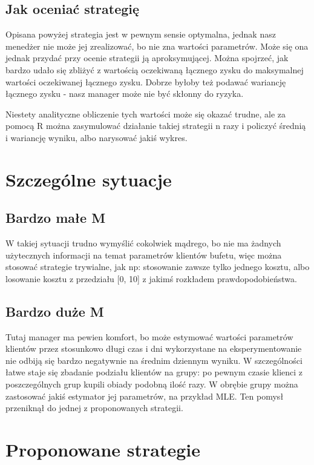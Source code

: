 \documentclass[a4paper,11pt]{article}
\begin{document}
\subsection{Jak oceniać strategię}
Opisana powyżej strategia jest w pewnym sensie optymalna, jednak nasz menedżer nie może
jej zrealizować, bo nie zna wartości parametrów. Może się ona jednak przydać przy
ocenie strategii ją aproksymującej. Można spojrzeć, jak bardzo udało się zbliżyć
z wartością oczekiwaną łącznego zysku do maksymalnej wartości oczekiwanej łącznego zysku.
Dobrze byłoby też podawać wariancję łącznego zysku - nasz manager może nie być
skłonny do ryzyka.

Niestety analityczne obliczenie tych wartości może się okazać trudne, ale za pomocą
R można zasymulować działanie takiej strategii n razy i policzyć średnią i wariancję
wyniku, albo narysować jakiś wykres.

\section{Szczególne sytuacje}

\subsection{Bardzo małe M}
W takiej sytuacji trudno wymyślić cokolwiek mądrego, bo nie ma żadnych użytecznych
informacji na temat parametrów klientów bufetu, więc można stosować strategie trywialne,
jak np: stosowanie zawsze tylko jednego kosztu, albo losowanie kosztu z przedziału [0, 10]
z jakimś rozkładem prawdopodobieństwa.

\subsection{Bardzo duże M}
Tutaj manager ma pewien komfort, bo może estymować wartości parametrów klientów
przez stosunkowo długi czas i dni wykorzystane na eksperymentowanie nie odbiją się
bardzo negatywnie na średnim dziennym wyniku. W szczególności łatwe staje się zbadanie
podziału klientów na grupy: po pewnym czasie klienci z poszczególnych grup kupili obiady
podobną ilość razy. W obrębie grupy można zastosować jakiś estymator jej parametrów,
na przykład MLE. Ten pomysł przeniknął do jednej z proponowanych strategii.

\section{Proponowane strategie}
\end{document}
